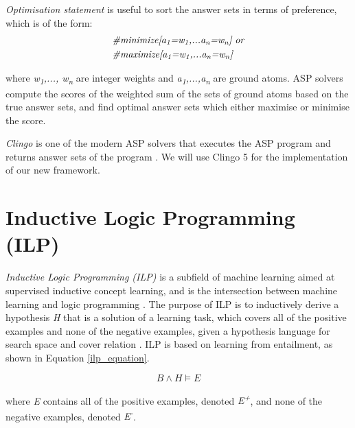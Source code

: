 \documentclass[11pt,twoside]{report}
\theoremstyle{plain}
\theoremstyle{definition}
\begin{document}
\textit{Optimisation statement} is useful to sort the answer sets in terms of preference, which is of the form:
\begin{equation}
\begin{split}
&\textit{\#minimize[a\textsubscript{1}=w\textsubscript{1},...a\textsubscript{n}=w\textsubscript{n}]} \ \textit{or} \\
&\textit{\#maximize[a\textsubscript{1}=w\textsubscript{1},...a\textsubscript{n}=w\textsubscript{n}]} \\
\end{split}
\label{asp_optimisation_statement}
\end{equation}

where \textit{w\textsubscript{1},..., w\textsubscript{n}} are integer weights and \textit{a\textsubscript{1},...,a\textsubscript{n}} are ground atoms.  ASP solvers compute the scores of the weighted sum of the sets of ground atoms based on the true answer sets, and find optimal answer sets which either maximise or minimise the score.

\textit{Clingo} is one of the modern ASP solvers that executes the ASP program and returns answer sets of the program \cite{Gebser2011}. We will use Clingo 5 for the implementation of our new framework.


\section{Inductive Logic Programming (ILP)}
\label{sec:ilp}

\textit{Inductive Logic Programming (ILP)} is a subfield of machine learning aimed at supervised inductive concept learning, and is the intersection between machine learning and logic programming \cite{Muggleton1991}. 
The purpose of ILP is to inductively derive a hypothesis \textit{H} that is a solution of a learning task, which covers all of the positive examples and none of the negative examples, given a hypothesis language for search space and cover relation \cite{DeRaedt1997}. 
ILP is based on learning from entailment, as shown in Equation \ref{ilp_equation}.

\begin{equation}\label{ilp_equation}
B \wedge H \models E
\end{equation}

where \textit{E} contains all of the positive examples, denoted \textit{E\textsuperscript{+}}, and none of the negative examples, denoted \textit{E\textsuperscript{-}}.
\end{document}
